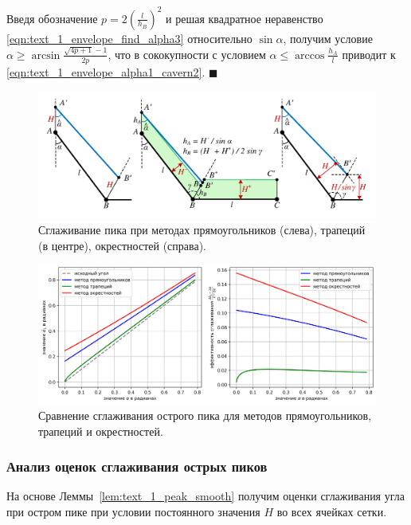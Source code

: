 Введя обозначение $p = 2 \left( \frac{l}{h_B} \right)^2$ и решая квадратное неравенство \eqref{eqn:text_1_envelope_find_alpha3} относительно $\sin \alpha$, получим условие $\alpha \ge \arcsin \frac{\sqrt{4p + 1} - 1}{2p}$, что в сококупности с условием $\alpha \le \arccos \frac{h_A}{l}$ приводит к \eqref{eqn:text_1_envelope_alpha1_cavern2}.
$\blacksquare$\\

\begin{figure}[ht]
\centering
\includegraphics[width=1.0\textwidth]{fig/2dr_peak_methods.pdf}
\singlespacing
{}\caption{Сглаживание пика при методах прямоугольников (слева), трапеций (в центре), окрестностей (справа).}
\label{fig:text_1_remesh_2d_peak_methods}
\end{figure}

\begin{figure}[ht]
\centering
\includegraphics[width=1.0\textwidth]{fig/2dr_peak_methods_chart.png}
\singlespacing
{}\caption{Сравнение сглаживания острого пика для методов прямоугольников, трапеций и окрестностей.}
\label{fig:text_1_remesh_2d_peak_methods_chart}
\end{figure}

\subsubsection{Анализ оценок сглаживания острых пиков}

На основе Леммы~\ref{lem:text_1_peak_smooth} получим оценки сглаживания угла при остром пике при условии постоянного значения $H$ во всех ячейках сетки.


